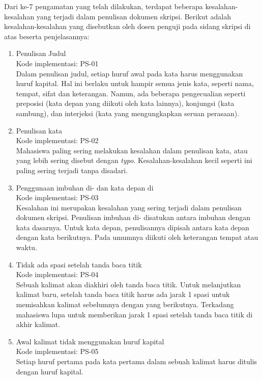 Dari ke-7 pengamatan yang telah dilakukan, terdapat beberapa kesalahan-kesalahan yang terjadi dalam penulisan dokumen skripsi. Berikut adalah kesalahan-kesalahan yang disebutkan oleh dosen penguji pada sidang skripsi di atas beserta penjelasannya:

\begin{enumerate}
	\item Penulisan Judul \\
	Kode implementasi: PS-01 \\	
	Dalam penulisan judul, setiap huruf awal pada kata harus menggunakan huruf kapital. Hal ini berlaku untuk hampir semua jenis kata, seperti nama, tempat, sifat dan keterangan. Namun, ada beberapa pengecualian seperti preposisi (kata depan yang diikuti oleh kata lainnya), konjungsi (kata sambung), dan interjeksi (kata yang mengungkapkan seruan perasaan).
	
	\item Penulisan kata \\
	Kode implementasi: PS-02 \\	
	Mahasiswa paling sering melakukan kesalahan dalam penulisan kata, atau yang lebih sering disebut dengan \textit{typo}. Kesalahan-kesalahan kecil seperti ini paling sering terjadi tanpa disadari.
	
	\item Penggunaan imbuhan di- dan kata depan di\\
	Kode implementasi: PS-03 \\	
	Kesalahan ini merupakan kesalahan yang sering terjadi dalam penulisan dokumen skripsi. Penulisan imbuhan di- disatukan antara imbuhan dengan kata dasarnya. Untuk kata depan, penulisannya dipisah antara kata depan dengan kata berikutnya. Pada umumnya diikuti oleh keterangan tempat atau waktu.
	
	\item Tidak ada spasi setelah tanda baca titik \\
	Kode implementasi: PS-04 \\	
	Sebuah kalimat akan diakhiri oleh tanda baca titik. Untuk melanjutkan kalimat baru, setelah tanda baca titik harus ada jarak 1 spasi untuk memisahkan kalimat sebelumnya dengan yang berikutnya. Terkadang mahasiswa lupa untuk memberikan jarak 1 spasi setelah tanda baca titik di akhir kalimat.

	\item Awal kalimat tidak menggunakan huruf kapital \\
	Kode implementasi: PS-05 \\	
	Setiap huruf pertama pada kata pertama dalam sebuah kalimat harus ditulis dengan huruf kapital. 	
	

\end{enumerate}
